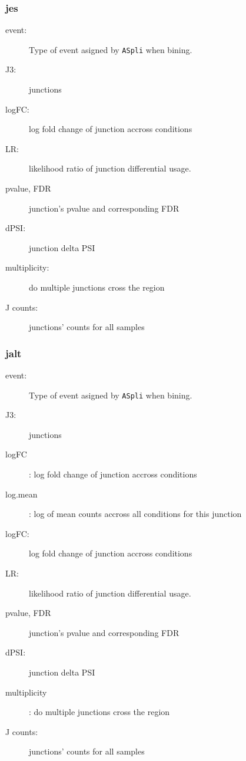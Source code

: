 \documentclass{article}
\begin{document}
\subsubsection*{jes}
  \begin{description}
  \item [event:] Type of event asigned by \texttt{ASpli} when bining. 
   \item [J3:] junctions
   \item [logFC:] log fold change of junction accross conditions
   \item [LR:] likelihood ratio of junction differential usage.
   \item [pvalue, FDR] junction's pvalue and corresponding FDR 
    \item [dPSI:] junction delta PSI
   \item [multiplicity:] do multiple junctions cross the region
   \item [J counts:] junctions' counts for all samples
\end{description}      
  
\subsubsection*{jalt}

  \begin{description}
   \item [event:] Type of event asigned by \texttt{ASpli} when bining. 
   \item [J3:] junctions
   \item [logFC]: log fold change of junction accross conditions
   \item [log.mean]: log of mean counts accross all conditions for this junction
   \item [logFC:] log fold change of junction accross conditions
   \item [LR:] likelihood ratio of junction differential usage.
   \item [pvalue, FDR] junction's pvalue and corresponding FDR 
   \item [dPSI:] junction delta PSI
   \item [multiplicity]: do multiple junctions cross the region
   \item [J counts:] junctions' counts for all samples
\end{description}      



\end{document}
